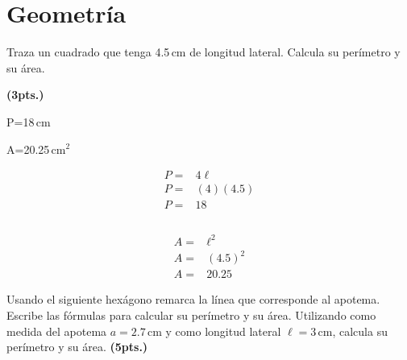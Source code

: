\documentclass[11pt]{article}
\begin{document}
\section{Geometr\'ia}
    
Traza un cuadrado que tenga 4.5\,cm de longitud lateral. Calcula su per\'imetro y
su \'area.

\hfill  \textbf{(3pts.)}

\begin{minipage}{0.3\linewidth}
    

P=18\,cm

A=20.25\,cm$^{2}$
\end{minipage}
\begin{minipage}[t]{0.3\linewidth}
\begin{align*}
P =& 4 \ell \\
P =& (4) (4.5) \\
P =& 18\\\\
\end{align*}
\end{minipage}
\begin{minipage}[t]{0.3\linewidth}
\begin{align*}
A =& \ell^{2} \\
A =& (4.5)^{2} \\
A =& 20.25 
\end{align*}

\end{minipage}

\vspace{1cm}


Usando el siguiente hex\'agono remarca la l\'inea que corresponde al apotema.
Escribe las f\'ormulas para calcular su per\'imetro y su \'area. Utilizando como
medida del apotema $a=2.7$\,cm y como longitud lateral $\ell=3$\,cm, calcula su
per\'imetro y su \'area. \hfill  \textbf{(5pts.)}
\end{document}
